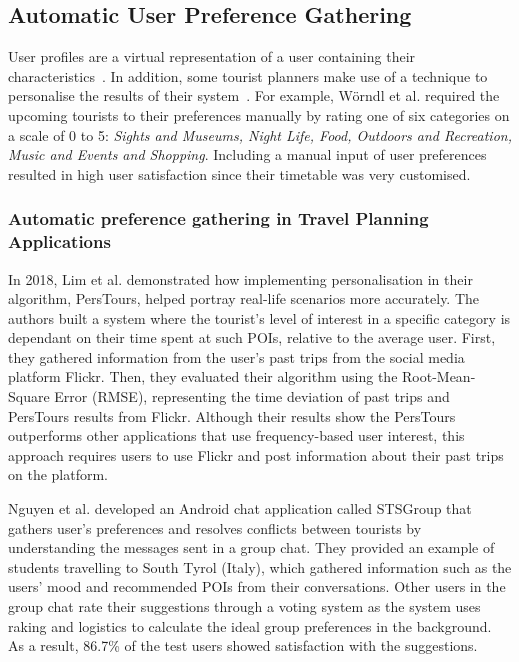 
\subsection{Automatic User Preference Gathering}

User profiles are a virtual representation of a user
containing their characteristics~\cite{Cufoglu}. In
addition, some tourist planners make use of a
technique to personalise the results of their
system~\cite{Worndl2017, Lim2018a, Tumas2009,
Gavalas2015}. For example, Wörndl et al.
\cite{Worndl2017} required the upcoming tourists to
their preferences manually by rating one of six
categories on a scale of 0 to 5: \textit{Sights and Museums,
Night Life, Food, Outdoors and Recreation, Music and
Events and Shopping}. Including a manual input of user
preferences resulted in high user satisfaction since
their timetable was very customised.

\subsubsection{Automatic preference gathering in Travel Planning Applications}

In 2018, Lim et al.\cite{Lim2018a} demonstrated how
implementing personalisation in their algorithm,
PersTours, helped portray real-life scenarios more
accurately. The authors built a system where the
tourist’s level of interest in a specific category is
dependant on their time spent at such POIs, relative
to the average user. First, they gathered information
from the user’s past trips from the social media
platform Flickr. Then, they evaluated their algorithm
using the Root-Mean-Square Error (RMSE), representing
the time deviation of past trips and PersTours results
from Flickr. Although their results show the PersTours
outperforms other applications that use
frequency-based user interest, this approach requires
users to use Flickr and post information about their
past trips on the platform.
 
Nguyen et al.\cite{Nguyen2018} developed an Android
chat application called STSGroup that gathers user’s
preferences and resolves conflicts between tourists by
understanding the messages sent in a group chat. They
provided an example of students travelling to South
Tyrol (Italy), which gathered information such as the
users’ mood and recommended POIs from their
conversations. Other users in the group chat rate
their suggestions through a voting system as the
system uses raking and logistics to calculate
the ideal group preferences in the background. As a
result, 86.7\% of the test users showed satisfaction
with the suggestions.  

